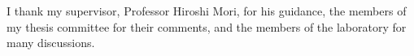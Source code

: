 I thank my supervisor, Professor Hiroshi Mori, for his guidance, the members of my thesis
committee for their comments, and the members of the laboratory for many discussions.
